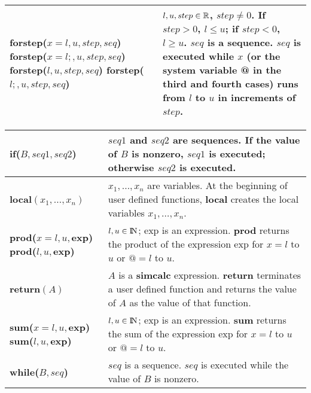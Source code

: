 \begin{tabular}{|p{1.95in}|p{3.7in}|}
{\bf forstep($x = l, u, step, seq$)\newline
forstep($x = l;, u, step, seq$)\newline
forstep($l, u, step, seq$)\newline
forstep($l;, u, step, seq$)} &
$l, u, step \in \mbox{$\mathbb R$}$, $step \neq 0$.\newline
If $step > 0$, $l \leq u$; if $step < 0$, $l \geq u$.\newline
$seq$ is a sequence.\newline
$seq$ is executed  while $x$ (or the system variable {\bf @} in
the third and fourth cases) runs from $l$ to $u$ in increments of
$step$.\\ \hline
\end{tabular}


\newpage

\begin{tabular}{|p{1.95in}|p{3.7in}|} \hline


{\bf if($B, seq1, seq2$)} &
$seq1$ and $seq2$ are sequences.\newline
If the value of $B$ is nonzero, $seq1$ is executed; otherwise
$seq2$ is executed.\\ \hline

{\bf local$(x_1,\ldots,x_n)$} &
{\bf $x_1,\ldots,x_n$} are variables.\newline
At the beginning of user defined functions, {\bf local} creates the local
variables {\bf $x_1,\ldots,x_n$}.\\ \hline

{\bf prod($x=l,u,$exp)}\newline
{\bf prod($l,u,$exp)} &
$l,u \in {\rm{I\!N}}$; exp is an expression.\newline
{\bf prod} returns the product of the expression exp for $x=l$ to $u$ or $@=l$ to $u$.\\ \hline

{\bf return$(A)$} &
{\bf $A$} is a {\bf simcalc} expression.\newline
{\bf return} terminates a user defined function and returns the value of
{\bf $A$} as the value of that function.\\ \hline

{\bf sum($x=l,u,$exp)}\newline
{\bf sum($l,u,$exp)} &
$l,u \in {\rm{I\!N}}$; exp is an expression.\newline
{\bf sum} returns the sum of the expression exp for $x=l$ to $u$ or $@=l$ to $u$.\\ \hline

{\bf while($B, seq$)} &
$seq$ is a sequence.\newline
$seq$ is executed while the value of $B$ is nonzero.\\ \hline
\end{tabular}

